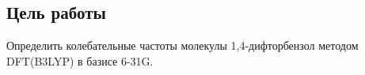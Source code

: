\subsection{Цель работы}
Определить колебательные частоты молекулы 1,4-дифторбензол методом DFT(B3LYP) в базисе 6-31G.
